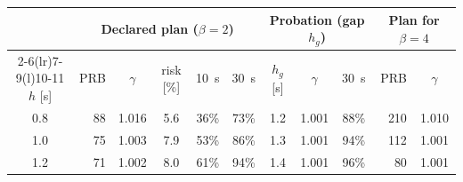 \begin{tabular}{@{}c r c c c c c c c r c@{}}
\toprule
 & \multicolumn{5}{c}{Declared plan ($\beta=2$)} & \multicolumn{3}{c}{Probation (gap $h_g$)} & \multicolumn{2}{c}{Plan for $\beta=4$}\\
\cmidrule(lr){2-6}\cmidrule(lr){7-9}\cmidrule(l){10-11}
$h$ [s] & PRB & $\gamma$ & risk [\%] & 10~s & 30~s & $h_g$ [s] & $\gamma$ & 30~s & PRB & $\gamma$\\
\midrule
0.8 & 88 & 1.016 & 5.6 & 36\% & 73\% & 1.2 & 1.001 & 88\% & 210 & 1.010\\
1.0 & 75 & 1.003 & 7.9 & 53\% & 86\% & 1.3 & 1.001 & 94\% & 112 & 1.001\\
1.2 & 71 & 1.002 & 8.0 & 61\% & 94\% & 1.4 & 1.001 & 96\% & 80 & 1.001\\
\bottomrule
\end{tabular}
